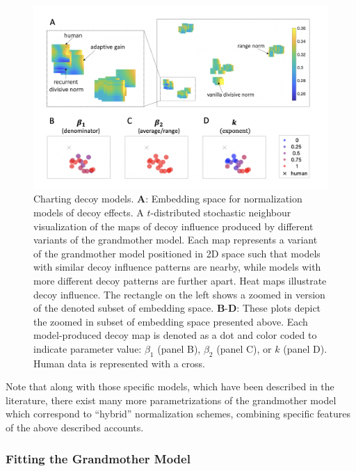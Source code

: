 \documentclass[a4paper, nobind]{templates/ociamthesis}
\begin{document}
\begin{figure}

{\centering \includegraphics[width=1\linewidth]{figures/decoy-grandmother} 

}

\caption[T-SNE plot of model maps]{Charting decoy models. $\textbf{A:}$ Embedding space for normalization models of decoy effects. A $t$-distributed stochastic neighbour visualization of the maps of decoy influence produced by different variants of the grandmother model. Each map represents a variant of the grandmother model positioned in 2D space such that models with similar decoy influence patterns are nearby, while models with more different decoy patterns are further apart. Heat maps illustrate decoy influence. The rectangle on the left shows a zoomed in version of the denoted subset of embedding space. $\textbf{B-D:}$ These plots depict the zoomed in subset of embedding space presented above. Each model-produced decoy map is denoted as a dot and color coded to indicate parameter value: $\beta_1$ (panel B), $\beta_2$ (panel C), or $k$ (panel D). Human data is represented with a cross.}\label{fig:decoy-grandmother}
\end{figure}

Note that along with those specific models, which have been described in the literature, there exist many more parametrizations of the grandmother model which correspond to ``hybrid'' normalization schemes, combining specific features of the above described accounts.

\hypertarget{fitting-the-grandmother-model}{%
\subsubsection{Fitting the Grandmother Model}\label{fitting-the-grandmother-model}}
\end{document}
